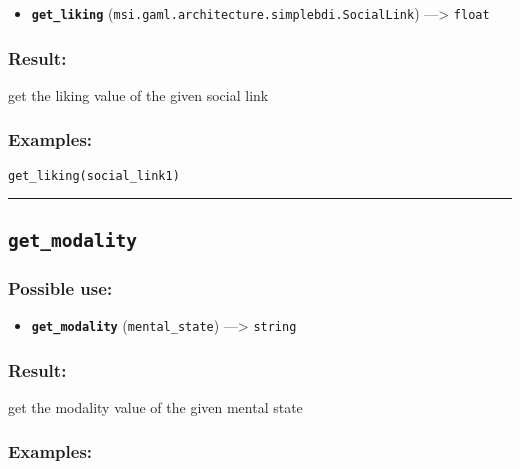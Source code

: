 \documentclass[]{book}
\providecommand{\tightlist}{%
  \setlength{\itemsep}{0pt}\setlength{\parskip}{0pt}}
\theoremstyle{definition}
\theoremstyle{definition}
\theoremstyle{definition}
\theoremstyle{remark}
\begin{document}
\begin{itemize}
\tightlist
\item
  \textbf{\texttt{get\_liking}}
  (\texttt{msi.gaml.architecture.simplebdi.SocialLink})
  ---\textgreater{} \texttt{float}
\end{itemize}

\subsubsection{Result:}\label{result-213}

get the liking value of the given social link

\subsubsection{Examples:}\label{examples-166}

\begin{verbatim}
get_liking(social_link1) 
\end{verbatim}

\begin{center}\rule{0.5\linewidth}{\linethickness}\end{center}

\subsection{\texorpdfstring{\texttt{get\_modality}}{get\_modality}}\label{get_modality}

\subsubsection{Possible use:}\label{possible-use-220}

\begin{itemize}
\tightlist
\item
  \textbf{\texttt{get\_modality}} (\texttt{mental\_state})
  ---\textgreater{} \texttt{string}
\end{itemize}

\subsubsection{Result:}\label{result-214}

get the modality value of the given mental state

\subsubsection{Examples:}\label{examples-167}
\end{document}
